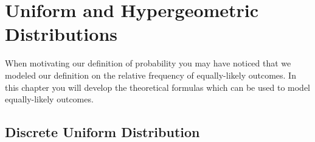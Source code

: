 \documentclass[10pt,]{book}
\theoremstyle{plain}
\theoremstyle{definition}
\theoremstyle{definition}
\theoremstyle{definition}
\numberwithin{equation}{section}
\begin{document}
\chapter[{Uniform and Hypergeometric Distributions}]{Uniform and Hypergeometric Distributions}\label{UniformHypergeometric}
\typeout{************************************************}
\typeout{************************************************}

	When motivating our definition of probability you may have noticed that we modeled our definition on the relative frequency of equally-likely outcomes. In this chapter you will develop the theoretical formulas which can be used to model equally-likely outcomes.
\typeout{************************************************}
\typeout{************************************************}
\section[{Discrete Uniform Distribution}]{Discrete Uniform Distribution}\label{section-26}
\end{document}
